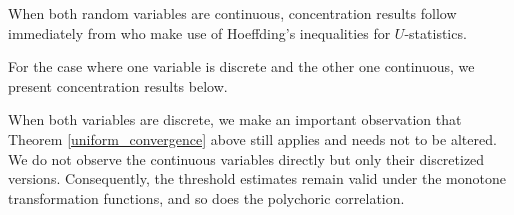 \begin{description}[labelwidth=4em, leftmargin =\dimexpr\labelwidth+\labelsep\relax, font=\mdseries]
    \item[\textit{Case I}:] When both random variables are continuous, concentration results follow immediately from \citet{Liu12} who make use of Hoeffding's inequalities for $U$-statistics.
    \item[\textit{Case II}:] For the case where one variable is discrete and the other one continuous, we present concentration results below.
    \item[\textit{Case III}:] When both variables are discrete, we make an important observation that Theorem \ref{uniform_convergence} above still applies and needs not to be altered. We do not observe the continuous variables directly but only their discretized versions. Consequently, the threshold estimates remain valid under the monotone transformation functions, and so does the polychoric correlation.
\end{description}

